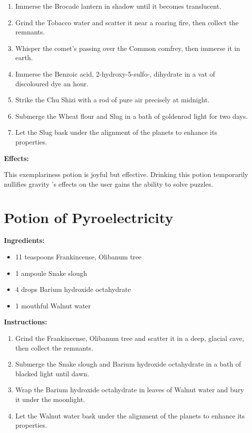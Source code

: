 \documentclass{article}
\begin{document}
\begin{enumerate}
  \item Immerse the Brocade lantern in shadow until it becomes translucent.
  \item Grind the Tobacco water and scatter it near a roaring fire, then collect the remnants.
  \item Whisper the comet’s passing over the Common comfrey, then immerse it in earth.
  \item Immerse the Benzoic acid, 2-hydroxy-5-sulfo-, dihydrate in a vat of discoloured dye an hour.
  \item Strike the Chu Shizi with a rod of pure air precisely at midnight.
  \item Submerge the Wheat flour and Slug in a bath of goldenrod light for two days.
  \item Let the Slug bask under the alignment of the planets to enhance its properties.
\end{enumerate}

\textbf{Effects:}

This exemplariness potion is joyful but effective. Drinking this potion temporarily nullifies gravity 's effects on the user gains the ability to solve puzzles.

\newpage
\section*{Potion of Pyroelectricity}

\textbf{Ingredients:}

\begin{itemize}
  \item 11 teaspoons Frankincense, Olibanum tree
  \item 1 ampoule Snake slough
  \item 4 drops Barium hydroxide octahydrate
  \item 1 mouthful Walnut water
\end{itemize}

\textbf{Instructions:}

\begin{enumerate}
  \item Grind the Frankincense, Olibanum tree and scatter it in a deep, glacial cave, then collect the remnants.
  \item Submerge the Snake slough and Barium hydroxide octahydrate in a bath of blacked light until dawn.
  \item Wrap the Barium hydroxide octahydrate in leaves of Walnut water and bury it under the moonlight.
  \item Let the Walnut water bask under the alignment of the planets to enhance its properties.
\end{enumerate}
\end{document}
